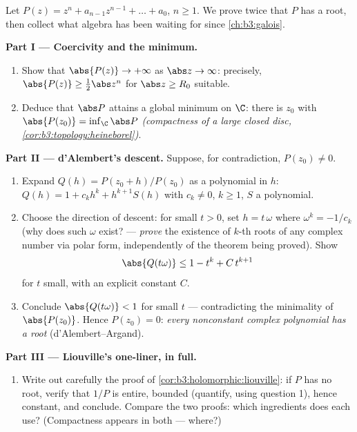 \begin{problem}\label{pb:b3:holomorphic:1}
Let $P(z) = z^n + a_{n-1}z^{n-1} + \dots + a_0$, $n \geq 1$.
We prove twice that $P$ has a root, then collect what algebra
has been waiting for since \cref{ch:b3:galois}.

\medskip
\noindent\textbf{Part I --- Coercivity and the minimum.}
\begin{enumerate}
  \item Show that $\abs{P(z)} \to +\infty$ as $\abs z \to
        \infty$: precisely, $\abs{P(z)} \geq \frac12\abs z^n$
        for $\abs z \geq R_0$ suitable.
  \item Deduce that $\abs P$ attains a global minimum on $\C$:
        there is $z_0$ with $\abs{P(z_0)} = \inf_\C\abs P$
        \emph{(compactness of a large closed disc,
        \cref{cor:b3:topology:heineborel})}.
\end{enumerate}

\medskip
\noindent\textbf{Part II --- d'Alembert's descent.} Suppose,
for contradiction, $P(z_0) \neq 0$.
\begin{enumerate}[resume]
  \item Expand $Q(h) = P(z_0 + h)/P(z_0)$ as a polynomial in
        $h$: $Q(h) = 1 + c_kh^k + h^{k+1}S(h)$ with $c_k \neq
        0$, $k \geq 1$, $S$ a polynomial.
  \item Choose the direction of descent: for small $t > 0$,
        set $h = t\,\omega$ where $\omega^k = -1/c_k$ (why
        does such $\omega$ exist? --- \emph{prove} the
        existence of $k$-th roots of any complex number via
        polar form, independently of the theorem being
        proved). Show
        \[
        \abs{Q(t\omega)} \leq 1 - t^k + C\,t^{k+1}
        \]
        for $t$ small, with an explicit constant $C$.
  \item Conclude $\abs{Q(t\omega)} < 1$ for small $t$ ---
        contradicting the minimality of $\abs{P(z_0)}$. Hence
        $P(z_0) = 0$: \emph{every nonconstant complex
        polynomial has a root} (d'Alembert--Argand).
\end{enumerate}

\medskip
\noindent\textbf{Part III --- Liouville's one-liner,
in full.}
\begin{enumerate}[resume]
  \item Write out carefully the proof of
        \cref{cor:b3:holomorphic:liouville}: if $P$ has no
        root, verify that $1/P$ is entire, bounded (quantify,
        using question 1), hence constant, and conclude.
        Compare the two proofs: which ingredients does each
        use? (Compactness appears in both --- where?)
\end{enumerate}


\end{problem}
